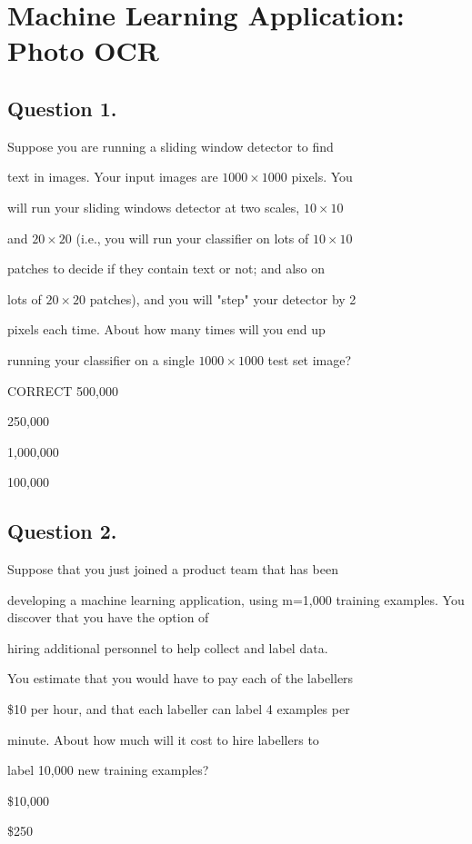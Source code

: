 \documentclass[11pt]{article} %
\begin{document}
\section{ Machine Learning Application: Photo OCR}


\subsection*{Question  1.}
Suppose you are running a sliding window detector to find

text in images. Your input images are $1000 \times 1000$ pixels. You

will run your sliding windows detector at two scales, $10 \times 10$

and $20 \times 20$ (i.e., you will run your classifier on lots of  $10 \times 10$

patches to decide if they contain text or not; and also on

lots of $20 \times 20$ patches), and you will "step" your detector by 2

pixels each time. About how many times will you end up

running your classifier on a single $1000 \times 1000$ test set image?

CORRECT 500,000

250,000

1,000,000

100,000

\subsection*{Question  2. }
Suppose that you just joined a product team that has been

developing a machine learning application, using m=1,000
training examples. You discover that you have the option of

hiring additional personnel to help collect and label data.

You estimate that you would have to pay each of the labellers

\$10 per hour, and that each labeller can label 4 examples per

minute. About how much will it cost to hire labellers to

label 10,000 new training examples?

\$10,000

\$250
\end{document}
